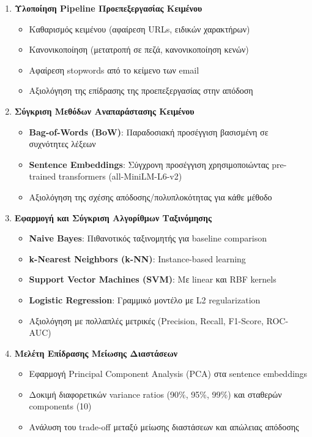 \documentclass[12pt,a4paper,twoside]{book}
\begin{document}
\begin{enumerate}
    \item \textbf{Υλοποίηση Pipeline Προεπεξεργασίας Κειμένου}
          \begin{itemize}
              \item Καθαρισμός κειμένου (αφαίρεση URLs, ειδικών χαρακτήρων)
              \item Κανονικοποίηση (μετατροπή σε πεζά, κανονικοποίηση κενών)
              \item Αφαίρεση stopwords από το κείμενο των email
              \item Αξιολόγηση της επίδρασης της προεπεξεργασίας στην απόδοση
          \end{itemize}

    \item \textbf{Σύγκριση Μεθόδων Αναπαράστασης Κειμένου}
          \begin{itemize}
              \item \textbf{Bag-of-Words (BoW)}: Παραδοσιακή προσέγγιση βασισμένη σε συχνότητες λέξεων
              \item \textbf{Sentence Embeddings}: Σύγχρονη προσέγγιση χρησιμοποιώντας pre-trained transformers (all-MiniLM-L6-v2)
              \item Αξιολόγηση της σχέσης απόδοσης/πολυπλοκότητας για κάθε μέθοδο
          \end{itemize}

    \item \textbf{Εφαρμογή και Σύγκριση Αλγορίθμων Ταξινόμησης}
          \begin{itemize}
              \item \textbf{Naive Bayes}: Πιθανοτικός ταξινομητής για baseline comparison
              \item \textbf{k-Nearest Neighbors (k-NN)}: Instance-based learning
              \item \textbf{Support Vector Machines (SVM)}: Με linear και RBF kernels
              \item \textbf{Logistic Regression}: Γραμμικό μοντέλο με L2 regularization
              \item Αξιολόγηση με πολλαπλές μετρικές (Precision, Recall, F1-Score, ROC-AUC)
          \end{itemize}

    \item \textbf{Μελέτη Επίδρασης Μείωσης Διαστάσεων}
          \begin{itemize}
              \item Εφαρμογή Principal Component Analysis (PCA) στα sentence embeddings
              \item Δοκιμή διαφορετικών variance ratios (90\%, 95\%, 99\%) και σταθερών components (10)
              \item Ανάλυση του trade-off μεταξύ μείωσης διαστάσεων και απώλειας απόδοσης
          \end{itemize}


\end{enumerate}
\end{document}
